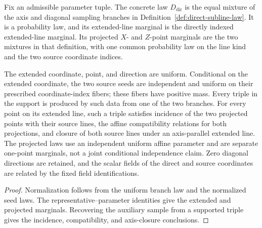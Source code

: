 \begin{lemma}
	\label{lem:direct-subline-law-construction}
	\leanok
	Fix an admissible parameter tuple. The concrete law $D_{\mathrm{dir}}$ is
	the equal mixture of the axis and
	diagonal sampling branches in Definition~\ref{def:direct-subline-law}. It is
	a probability law, and its extended-line marginal is the directly indexed
	extended-line marginal. Its projected $X$- and $Z$-point marginals are the
	two mixtures in that definition, with one common probability law on the line
	kind and the two source coordinate indices.

	The extended coordinate, point, and direction are uniform. Conditional on
	the extended coordinate, the two source seeds are independent and uniform
	on their prescribed coordinate-index fibers; these fibers have positive
	mass. Every triple in the support is produced by such data from one of the
	two branches. For every point on its extended line, such a triple satisfies
	incidence of the two projected points with their source lines, the affine
	compatibility relations for both projections, and closure of both source lines under an
	axis-parallel extended line.
	The projected laws use an independent uniform affine parameter and are
	separate one-point marginals, not a joint conditional independence claim.
	Zero diagonal directions are retained, and the scalar fields of the direct
	and source coordinates are related by the fixed field identifications.
\end{lemma}
\begin{proof}
	\leanok
	Normalization follows from the uniform branch law and the normalized seed
	laws. The representative--parameter identities give the extended and
	projected marginals. Recovering the auxiliary sample from a supported triple
	gives the incidence, compatibility, and axis-closure conclusions.
\end{proof}

